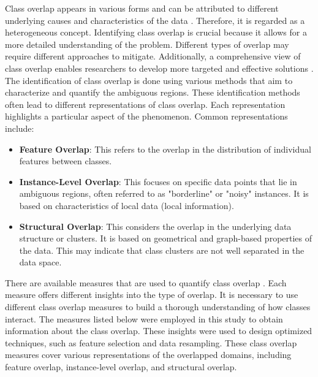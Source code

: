 Class overlap appears in various forms and can be attributed to different underlying causes and characteristics of the data \cite{Santos2023Unifying}. Therefore, it is regarded as a heterogeneous concept. Identifying class overlap is crucial because it allows for a more detailed understanding of the problem. Different types of overlap may require different approaches to mitigate. Additionally, a comprehensive view of class overlap enables researchers to develop more targeted and effective solutions \cite{Santos2023Unifying}. The identification of class overlap is done using various methods that aim to characterize and quantify the ambiguous regions. These identification methods often lead to different representations of class overlap. Each representation highlights a particular aspect of the phenomenon. Common representations include:
\begin{itemize}
\item \textbf{Feature Overlap}: This refers to the overlap in the distribution of individual features between classes.
\item \textbf{Instance-Level Overlap}: This focuses on specific data points that lie in ambiguous regions, often referred to as "borderline" or "noisy" instances. It is based on characteristics of local data (local information).
\item \textbf{Structural Overlap}: This considers the overlap in the underlying data structure or clusters. It is based on geometrical and graph-based properties of the data. This may indicate that class clusters are not well separated in the data space.
\end{itemize}
\vspace{2em}


There are available measures that are used to quantify class overlap \cite{Santos2022Joint}. Each measure offers different insights into the type of overlap. It is necessary to use different class overlap measures to build a thorough understanding of how classes interact. The measures listed below were employed in this study to obtain information about the class overlap. These insights were used to design optimized techniques, such as feature selection and data resampling. These class overlap measures cover various representations of the overlapped domains, including feature overlap, instance-level overlap, and structural overlap.

